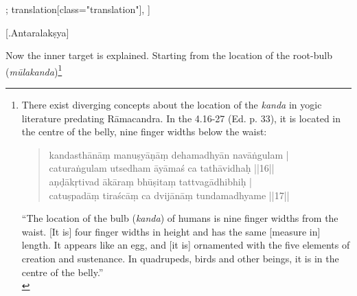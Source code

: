 \begin{alignment}[
  texts=edition[class="edition"];
  translation[class="translation"],
  ]
\begin{translation}
    \begin{tlate}
    \centerline{\textrm{\small{[.\textsuperscript{}Antaralakṣya]}}}
    \bigskip
    \noindent
    Now the inner target is explained. Starting from the location of the root-bulb (\textit{mūlakanda})\footnote{There exist diverging concepts about the location of the \textit{kanda} in yogic literature predating Rāmacandra. In the  4.16-27 (Ed. p. 33), it is located in the centre of the belly, nine finger widths below the waist:
      \begin{quote}
        kandasthānāṃ manuṣyāṇāṃ dehamadhyān navāṅgulam |\\
        caturaṅgulam utsedham āyāmaś ca tathāvidhaḥ ||16||\\
        aṇḍākṛtivad ākāraṃ bhūṣitaṃ tattvagādhibhiḥ |\\
        catuṣpadāṃ tiraścāṃ ca dvijānāṃ tundamadhyame ||17||
        \end{quote}
``The location of the bulb (\textit{kanda}) of humans is nine finger widths from the waist. [It is] four finger widths in height and has the same [measure in] length. It appears like an egg, and [it is] ornamented with the five elements of creation and sustenance. In quadrupeds, birds and other beings, it is in the centre of the belly.''\\
}
\end{tlate}
\end{translation}
\end{alignment}
